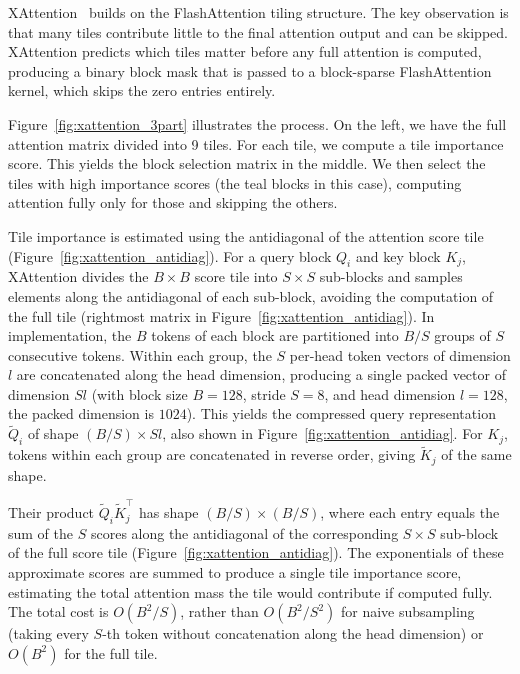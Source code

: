 XAttention~\citep{xu2025xattention} builds on the FlashAttention tiling structure. The key observation is that many tiles contribute little to the final attention output and can be skipped. XAttention predicts which tiles matter before any full attention is computed, producing a binary block mask that is passed to a block-sparse FlashAttention kernel, which skips the zero entries entirely.

Figure~\ref{fig:xattention_3part} illustrates the process. On the left, we have the full attention matrix divided into 9 tiles. For each tile, we compute a tile importance score. This yields the block selection matrix in the middle. We then select the tiles with high importance scores (the teal blocks in this case), computing attention fully only for those and skipping the others.

Tile importance is estimated using the antidiagonal of the attention score tile (Figure~\ref{fig:xattention_antidiag}). For a query block $Q_i$ and key block $K_j$, XAttention divides the $B \times B$ score tile into $S \times S$ sub-blocks and samples elements along the antidiagonal of each sub-block, avoiding the computation of the full tile (rightmost matrix in Figure~\ref{fig:xattention_antidiag}). In implementation, the $B$ tokens of each block are partitioned into $B/S$ groups of $S$ consecutive tokens. Within each group, the $S$ per-head token vectors of dimension $l$ are concatenated along the head dimension, producing a single packed vector of dimension $Sl$ (with block size $B=128$, stride $S=8$, and head dimension $l=128$, the packed dimension is $1024$). This yields the compressed query representation $\tilde{Q}_i$ of shape $(B/S) \times Sl$, also shown in Figure~\ref{fig:xattention_antidiag}. For $K_j$, tokens within each group are concatenated in reverse order, giving $\tilde{K}_j$ of the same shape.

Their product $\tilde{Q}_i \tilde{K}_j^\top$ has shape $(B/S) \times (B/S)$, where each entry equals the sum of the $S$ scores along the antidiagonal of the corresponding $S \times S$ sub-block of the full score tile (Figure~\ref{fig:xattention_antidiag}). The exponentials of these approximate scores are summed to produce a single tile importance score, estimating the total attention mass the tile would contribute if computed fully. The total cost is $O(B^2/S)$, rather than $O(B^2/S^2)$ for naive subsampling (taking every $S$-th token without concatenation along the head dimension) or $O(B^2)$ for the full tile.

